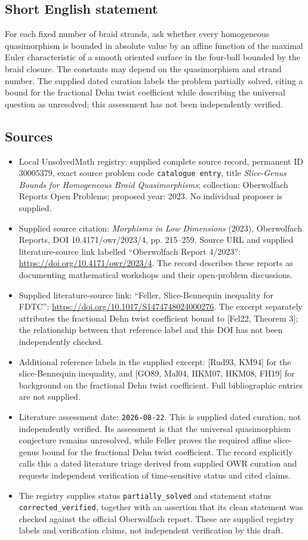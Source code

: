 \documentclass[11pt]{article}
\begin{document}
\subsection{Short English statement}
For each fixed number of braid strands, ask whether every homogeneous quasimorphism is bounded in absolute value by an affine function of the maximal Euler characteristic of a smooth oriented surface in the four-ball bounded by the braid closure. The constants may depend on the quasimorphism and strand number. The supplied dated curation labels the problem partially solved, citing a bound for the fractional Dehn twist coefficient while describing the universal question as unresolved; this assessment has not been independently verified.
\subsection{Sources}
\begin{itemize}
\item Local UnsolvedMath registry: supplied complete source record, permanent ID \(30005379\), exact source problem code \texttt{catalogue entry}, title \emph{Slice-Genus Bounds for Homogeneous Braid Quasimorphisms}; collection: Oberwolfach Reports Open Problems; proposed year: 2023. No individual proposer is supplied.
\item Supplied source citation: \emph{Morphisms in Low Dimensions} (2023), Oberwolfach Reports, DOI 10.4171/owr/2023/4, pp. 215--259. Source URL and supplied literature-source link labelled ``Oberwolfach Report 4/2023'': \url{https://doi.org/10.4171/owr/2023/4}. The record describes these reports as documenting mathematical workshops and their open-problem discussions.
\item Supplied literature-source link: ``Feller, Slice-Bennequin inequality for FDTC'': \url{https://doi.org/10.1017/S1474748024000276}. The excerpt separately attributes the fractional Dehn twist coefficient bound to [Fel22, Theorem 3]; the relationship between that reference label and this DOI has not been independently checked.
\item Additional reference labels in the supplied excerpt: [Rud93, KM94] for the slice-Bennequin inequality, and [GO89, Mal04, HKM07, HKM08, FH19] for background on the fractional Dehn twist coefficient. Full bibliographic entries are not supplied.
\item Literature assessment date: \texttt{2026-08-22}. This is supplied dated curation, not independently verified. Its assessment is that the universal quasimorphism conjecture remains unresolved, while Feller proves the required affine slice-genus bound for the fractional Dehn twist coefficient. The record explicitly calls this a dated literature triage derived from supplied OWR curation and requests independent verification of time-sensitive status and cited claims.
\item The registry supplies status \texttt{partially\_solved} and statement status \texttt{corrected\_verified}, together with an assertion that its clean statement was checked against the official Oberwolfach report. These are supplied registry labels and verification claims, not independent verification by this draft.
\end{itemize}
\end{document}
